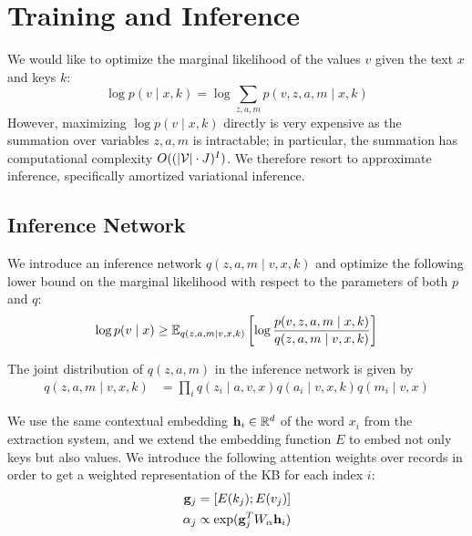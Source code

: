\documentclass[12pt]{article}
\begin{document}
\section{Training and Inference}
We would like to optimize the marginal likelihood of the values $v$ given the 
text $x$ and keys $k$:
\begin{equation}
\log p(v \mid x,k) = \log \sum_{z,a,m} p(v,z,a,m \mid x,k)
\end{equation}
However, maximizing $\log p(v \mid x,k)$ directly is very expensive 
as the summation over variables $z,a,m$ is intractable;
in particular,
the summation has computational complexity $O((|\mathcal{V}|\cdot J)^{I})$.
We therefore resort to approximate inference,
specifically amortized variational inference.

\subsection{Inference Network}
We introduce an inference network $q(z,a,m\mid v,x,k)$
and optimize the following lower bound on the marginal likelihood
with respect to the parameters of both $p$ and $q$:
\begin{equation}
\label{eqn:lowerbound}
\log p(v\mid x) \geq
\mathbb{E}_{q(z,a,m\mid v,x,k)}\left[\log \frac{p(v,z,a,m\mid x,k)}{q(z,a,m\mid v,x,k)}\right]
\end{equation}

The joint distribution of $q(z,a,m)$ in the inference network is given by
\begin{equation}
\label{eqn:elbo}
\begin{aligned}
q(z,a,m\mid v,x,k) &= \prod_i q(z_i \mid a,v,x)q(a_i \mid v,x,k)q(m_i \mid v,x)
\end{aligned}
\end{equation}

We use the same contextual embedding $\mathbf{h}_i \in \mathbb{R}^d$ of the word $x_i$
from the extraction system,
and we extend the embedding function $E$ to embed not only keys but also values.
We introduce the following attention weights over records
in order to get a weighted representation
of the KB for each index $i$:
\begin{equation}
\label{eqn:attn}
\begin{aligned}
\mathbf{g}_j &= [E(k_j); E(v_j)]\\
\alpha_j &\propto \exp(\mathbf{g}_{j}^T W_\alpha \mathbf{h}_i)
\end{aligned}
\end{equation}
\end{document}
